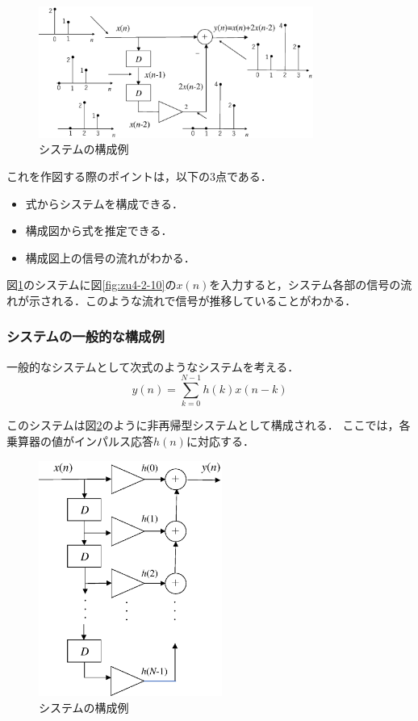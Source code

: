 \begin{figure}[t]
\begin{center}
\includegraphics[width=9cm]{fig/zu-2-11.eps}
\end{center}
\caption{システムの構成例}
\label{fig:zu4-2-11}
\end{figure}

これを作図する際のポイントは，以下の3点である．
\begin{itemize}
\item 式からシステムを構成できる．
\item 構成図から式を推定できる．
\item 構成図上の信号の流れがわかる．
\end{itemize}

図\ref{fig:zu4-2-11}のシステムに図\ref{fig:zu4-2-10}の$x(n)$を入力すると，システム各部の信号の流れが示される．このような流れで信号が推移していることがわかる．

\newpage

\subsubsection{システムの一般的な構成例}

一般的なシステムとして次式のようなシステムを考える．
\begin{equation}
y(n)=\sum_{k=0}^{N-1}h(k)x(n-k)
\end{equation}

このシステムは図\ref{fig:zu4-2-12}のように非再帰型システムとして構成される．
ここでは，各乗算器の値がインパルス応答$h(n)$に対応する．


\begin{figure}[H]
\begin{center}
\includegraphics[width=6cm]{fig/zu-2-12.eps}
\end{center}
\caption{システムの構成例}
\label{fig:zu4-2-12}
\end{figure}

